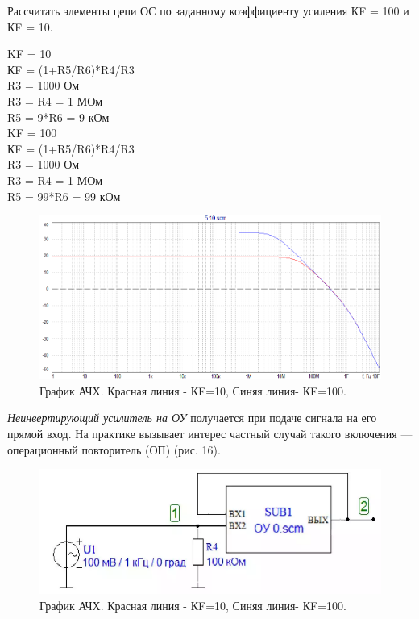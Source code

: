 \documentclass[a4paper,14pt]{extarticle}
\begin{document}
    Рассчитать элементы цепи ОС по заданному коэффициенту усиления КF = 100
    и КF = 10.
    \begin{multicols}{2}
    \noindent KF = 10\\
    КF = (1+R5/R6)*R4/R3\\
    R3 = 1000 Ом\\
    R3 = R4 = 1 МОм\\
    \columnbreak
    R5 = 9*R6 = 9 кОм\\
    KF = 100\\
    КF = (1+R5/R6)*R4/R3\\
    R3 = 1000 Ом\\
    R3 = R4 = 1 МОм\\
    R5 = 99*R6 = 99 кОм\\
    \end{multicols}
    \begin{figure}[h!]
        \begin{center}
            \includegraphics[scale=0.5]{13.png}
        \end{center}
        \vspace{-0.7cm}
        \caption{График АЧХ. Красная линия - КF=10, Синяя линия- КF=100.}
    \end{figure}
   
    \emph{Неинвертирующий усилитель на ОУ} получается при подаче сигнала 
    на его прямой вход. На практике вызывает интерес частный случай 
    такого включения — операционный повторитель (ОП) (рис. 16).

    \begin{figure}[h!]
        \begin{center}
            \includegraphics[scale=0.5]{14.png}
        \end{center}
        \vspace{-0.7cm}
        \caption{График АЧХ. Красная линия - КF=10, Синяя линия- КF=100.}
    \end{figure}
\end{document}
